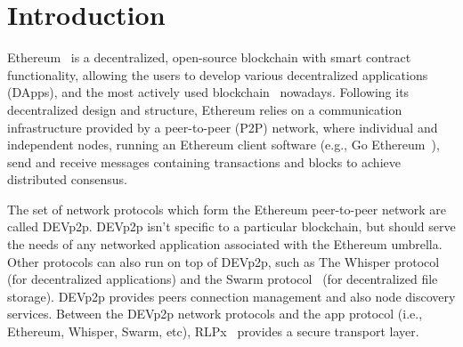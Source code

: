 
\section{Introduction}

Ethereum~\cite{} is a decentralized, open-source blockchain with smart contract functionality, allowing the users to develop various decentralized applications (DApps),  and the most actively used blockchain~\cite{bloomberg} nowadays.
Following its decentralized design and structure, Ethereum relies on a communication infrastructure provided by a peer-to-peer (P2P) network, where individual and independent nodes, running an Ethereum client software (e.g., Go Ethereum~\cite{go-ethereum}), send and receive messages  containing transactions and blocks to achieve distributed consensus.

The set of network protocols which form the Ethereum peer-to-peer network are called DEVp2p. DEVp2p isn't specific to a particular blockchain, but should serve the needs of any networked application associated with the Ethereum umbrella.
Other protocols can also run on top of DEVp2p, such as 
The Whisper protocol~\cite{} (for decentralized
applications) and the Swarm protocol~\cite{} (for decentralized file
storage).
DEVp2p provides peers connection management and also node discovery services.
Between the DEVp2p network protocols and the app protocol (i.e., Ethereum, Whisper, Swarm, etc), RLPx~\cite{} provides a secure transport layer. 

